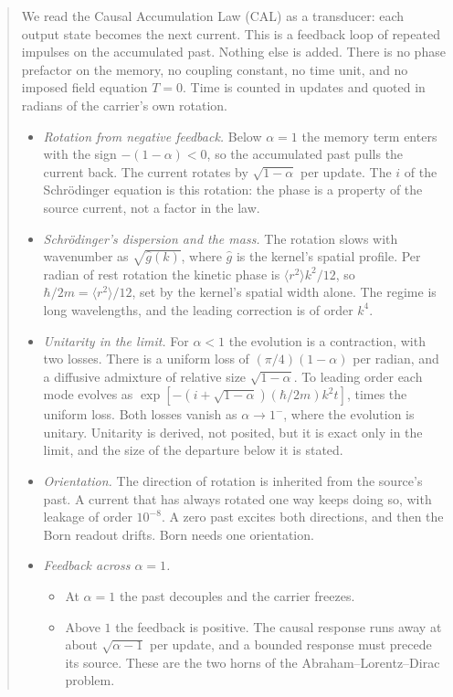 \documentclass[11pt]{amsart}
\theoremstyle{definition}
\theoremstyle{remark}
\begin{document}
\begin{abstract}
We read the Causal Accumulation Law (CAL) as a transducer: each output state becomes the next current. This is a feedback loop of repeated impulses on the accumulated past. Nothing else is added. There is no phase prefactor on the memory, no coupling constant, no time unit, and no imposed field equation $T=0$. Time is counted in updates and quoted in radians of the carrier's own rotation.

\begin{itemize}
\item \emph{Rotation from negative feedback.} Below $\alpha=1$ the memory term enters with the sign $-(1-\alpha)<0$, so the accumulated past pulls the current back. The current rotates by $\sqrt{1-\alpha}$ per update. The $i$ of the Schr\"odinger equation is this rotation: the phase is a property of the source current, not a factor in the law.
\item \emph{Schr\"odinger's dispersion and the mass.} The rotation slows with wavenumber as $\sqrt{\hat g(k)}$, where $\hat g$ is the kernel's spatial profile. Per radian of rest rotation the kinetic phase is $\langle r^2\rangle k^2/12$, so $\hbar/2m=\langle r^2\rangle/12$, set by the kernel's spatial width alone. The regime is long wavelengths, and the leading correction is of order $k^4$.
\item \emph{Unitarity in the limit.} For $\alpha<1$ the evolution is a contraction, with two losses. There is a uniform loss of $(\pi/4)(1-\alpha)$ per radian, and a diffusive admixture of relative size $\sqrt{1-\alpha}$. To leading order each mode evolves as $\exp[-(i+\sqrt{1-\alpha})(\hbar/2m)k^2t]$, times the uniform loss. Both losses vanish as $\alpha\to1^-$, where the evolution is unitary. Unitarity is derived, not posited, but it is exact only in the limit, and the size of the departure below it is stated.
\item \emph{Orientation.} The direction of rotation is inherited from the source's past. A current that has always rotated one way keeps doing so, with leakage of order $10^{-8}$. A zero past excites both directions, and then the Born readout drifts. Born needs one orientation.
\item \emph{Feedback across $\alpha=1$.}
\begin{itemize}
\item At $\alpha=1$ the past decouples and the carrier freezes.
\item Above $1$ the feedback is positive. The causal response runs away at about $\sqrt{\alpha-1}$ per update, and a bounded response must precede its source. These are the two horns of the Abraham--Lorentz--Dirac problem.

\end{itemize}
\end{itemize}
\end{abstract}
\end{document}
